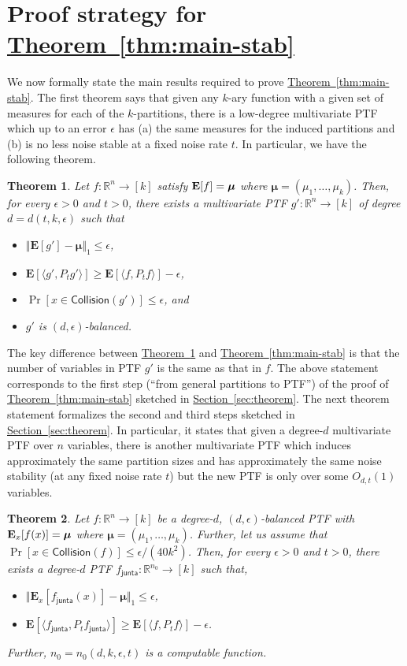 \documentclass[11pt]{article}
\numberwithin{equation}{section}
\newtheorem{theorem}{Theorem}[section]
\theoremstyle{definition}
\theoremstyle{plain}
\newcommand{\expref}[2]{\hyperref[#2]{#1~\ref{#2}}}
\newcommand{\E}{{\bf E}}
\newcommand{\fh}{{f_{\mathsf{junta}}}}
\begin{document}
\section{Proof strategy for \expref{Theorem}{thm:main-stab}}
We now formally state the main results required to prove \expref{Theorem}{thm:main-stab}. The first theorem says that given any $k$-ary function with a given set of measures for each of the $k$-partitions, there is a low-degree multivariate PTF which up to an error $\epsilon$ has 
(a)  the same measures for the induced partitions and (b) is no less noise stable at a fixed noise rate $t$.
In particular, we have the following theorem. 
\begin{theorem}\label{thm:1}
  Let $f: \mathbb{R}^n \rightarrow [k]$ satisfy $\E[f] = \boldsymbol{\mu}$ where $\boldsymbol{\mu} = (\mu_1, \ldots, \mu_k)$. Then, for every
  $\epsilon>0$ and $t >0$, there exists a multivariate PTF $g': \mathbb{R}^n \rightarrow
  [k]$ of degree $d = d(t, k, \epsilon)$ such that
  \begin{itemize}
    \item $\Vert \mathbf{E}[g'] - \boldsymbol{\mu} \Vert_1 \le \epsilon$,
    \item $\mathbf{E}[\langle g', P_t g' \rangle] \ge\mathbf{E}[ \langle f, P_t f \rangle] - \epsilon$,
    \item $\Pr [x \in \mathsf{Collision} (g')] \le \epsilon$, and
  \item $g'$ is $(d, \epsilon)$-balanced.
  \end{itemize}
\end{theorem}
The key difference between \expref{Theorem}{thm:1} and \expref{Theorem}{thm:main-stab} is that the number of variables in PTF $g'$ is the same as that in $f$. The above statement corresponds to the first step (``from general partitions to PTF'') of the proof of \expref{Theorem}{thm:main-stab} sketched in \expref{Section}{sec:theorem}. The next theorem statement formalizes the second and third steps sketched in \expref{Section}{sec:theorem}. In particular, it states that given a degree-$d$ multivariate PTF over $n$ variables, there is another multivariate PTF which induces approximately the same partition sizes and has approximately the same noise stability (at any fixed noise rate $t$) but the new PTF is only over some $O_{d,t}(1)$ variables.
\begin{theorem}\label{thm:reduction}
  Let $f: \mathbb{R}^n \rightarrow [k]$ be a degree-$d$, $(d,\epsilon)$-balanced  PTF with $\E_{x}[f(x)] = \boldsymbol{\mu}$ where $\boldsymbol{\mu} = (\mu_1, \ldots, \mu_k)$.  Further, let us assume that 
$\Pr[x \in \mathsf{Collision} (f)] \le \epsilon/(40 k^2)$.  
  Then, for every $\epsilon>0$ and $t > 0$, there exists a degree-$d$ 
PTF $\fh: \mathbb{R}^{n_0} \rightarrow [k]$ such that, \begin{itemize} \item  $\Vert \mathbf{E}_{x} [\fh(x)] - \boldsymbol{\mu} \Vert_1 \le \epsilon$, \item $ \mathbf{E}[\langle \fh, P_t \fh \rangle] \ge \mathbf{E}[\langle f, P_t f \rangle] - \epsilon$. %
\end{itemize} Further, $n_0 = n_0 (d,k,\epsilon, t)$ is a computable function.   
\end{theorem}
\end{document}
